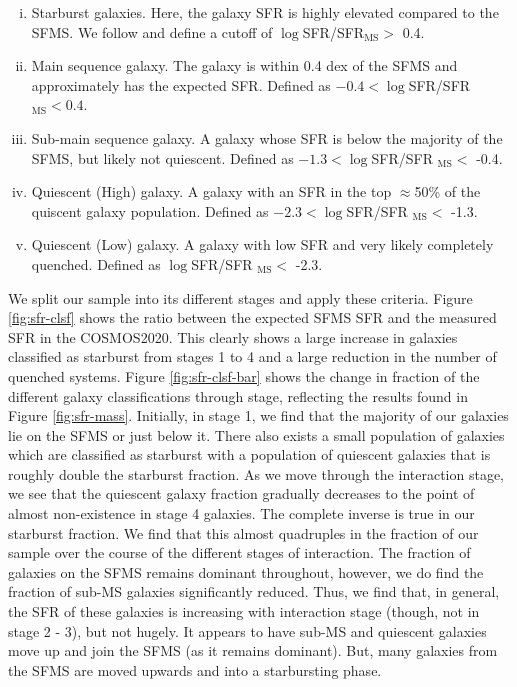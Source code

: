 \begin{enumerate}[(i)]
    \item Starburst galaxies. Here, the galaxy SFR is highly elevated compared to the SFMS. We follow \citet{2019MNRAS.484.4360A} and define a cutoff of $\log$SFR/SFR$_{\text{MS}} >$ 0.4.
    \item Main sequence galaxy. The galaxy is within 0.4 dex of the SFMS and approximately has the expected SFR. Defined as $-0.4 < \log$SFR/SFR$_{\text{MS}} < 0.4$.
    \item Sub-main sequence galaxy. A galaxy whose SFR is below the majority of the SFMS, but likely not quiescent. Defined as $-1.3 < \log$SFR/SFR $_{\text{MS}} < $ -0.4.
    \item Quiescent (High) galaxy. A galaxy with an SFR in the top $\approx$50\% of the quiscent galaxy population. Defined as $-2.3 < \log$SFR/SFR $_{\text{MS}} <$ -1.3.
    \item Quiescent (Low) galaxy. A galaxy with low SFR and very likely completely quenched. Defined as $\log$SFR/SFR $_{\text{MS}} <$ -2.3.
\end{enumerate}

\noindent We split our sample into its different stages and apply these criteria. Figure \ref{fig:sfr-clsf} shows the ratio between the expected SFMS SFR and the measured SFR in the COSMOS2020. This clearly shows a large increase in galaxies classified as starburst from stages 1 to 4 and a large reduction in the number of quenched systems. Figure \ref{fig:sfr-clsf-bar} shows the change in fraction of the different galaxy classifications through stage, reflecting the results found in Figure \ref{fig:sfr-mass}. Initially, in stage 1, we find that the majority of our galaxies lie on the SFMS or just below it. There also exists a small population of galaxies which are classified as starburst with a population of quiescent galaxies that is roughly double the starburst fraction. As we move through the interaction stage, we see that the quiescent galaxy fraction gradually decreases to the point of almost non-existence in stage 4 galaxies. The complete inverse is true in our starburst fraction. We find that this almost quadruples in the fraction of our sample over the course of the different stages of interaction. The fraction of galaxies on the SFMS remains dominant throughout, however, we do find the fraction of sub-MS galaxies significantly reduced. Thus, we find that, in general, the SFR of these galaxies is increasing with interaction stage (though, not in stage 2 - 3), but not hugely. It appears to have sub-MS and quiescent galaxies move up and join the SFMS (as it remains dominant). But, many galaxies from the SFMS are moved upwards and into a starbursting phase.

